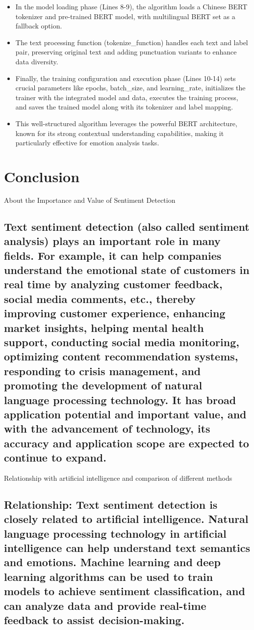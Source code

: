 \documentclass[journal]{IEEEtran}
\begin{document}
\begin{itemize}[leftmargin = *]
    \item In the model loading phase (Lines 8-9), the algorithm loads a Chinese BERT tokenizer and pre-trained BERT model, with multilingual BERT set as a fallback option. \\
    \item The text processing function (tokenize_function) handles each text and label pair, preserving original text and adding punctuation variants to enhance data diversity.\\
    \item Finally, the training configuration and execution phase (Lines 10-14) sets crucial parameters like epochs, batch_size, and learning_rate, initializes the trainer with the integrated model and data, executes the training process, and saves the trained model along with its tokenizer and label mapping. \\
    \item This well-structured algorithm leverages the powerful BERT architecture, known for its strong contextual understanding capabilities, making it particularly effective for emotion analysis tasks.
\end{itemize}

\section{Conclusion}
About the Importance and Value of Sentiment Detection
\subsection{Text sentiment detection (also called sentiment analysis) plays an important role in many fields. For example, it can help companies understand the emotional state of customers in real time by analyzing customer feedback, social media comments, etc., thereby improving customer experience, enhancing market insights, helping mental health support, conducting social media monitoring, optimizing content recommendation systems, responding to crisis management, and promoting the development of natural language processing technology. It has broad application potential and important value, and with the advancement of technology, its accuracy and application scope are expected to continue to expand.}

Relationship with artificial intelligence and comparison of different methods

\subsection{Relationship: Text sentiment detection is closely related to artificial intelligence. Natural language processing technology in artificial intelligence can help understand text semantics and emotions. Machine learning and deep learning algorithms can be used to train models to achieve sentiment classification, and can analyze data and provide real-time feedback to assist decision-making.}
\end{document}
